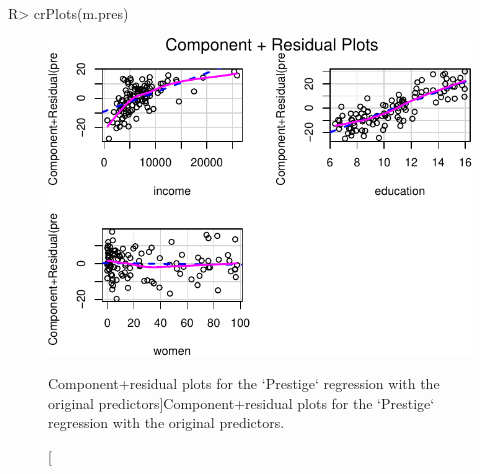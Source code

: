 \documentclass[
]{jss}
\begin{document}
\begin{CodeChunk}
\begin{CodeInput}
R> crPlots(m.pres)
\end{CodeInput}
\begin{figure}

{\centering \includegraphics{JSS-article_files/figure-latex/CR-plots-untransformed-1} 

}

\caption[Component+residual plots for the `Prestige` regression with the original predictors]{Component+residual plots for the `Prestige` regression with the original predictors.}\label{fig:CR-plots-untransformed}
\end{figure}
\end{CodeChunk}
\end{document}
